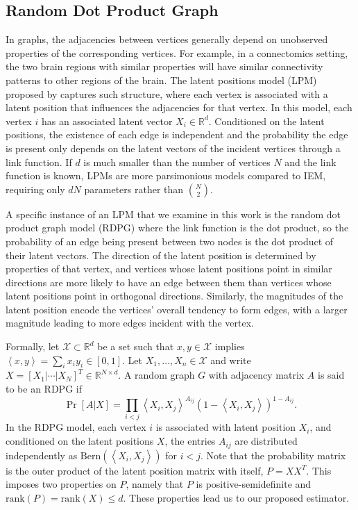 \documentclass[10pt,letterpaper]{article}
\renewcommand{\Re}{\mathbb{R}}
\begin{document}
\subsection{Random Dot Product Graph}
In graphs, the adjacencies between vertices generally depend on unobserved properties of the corresponding vertices. For example, in a connectomics setting, the two brain regions with similar properties will have similar connectivity patterns to other regions of the brain.
The latent positions model (LPM) proposed by \citep{hoff2002latent} captures such structure, where each vertex is associated with a latent position that influences the adjacencies for that vertex.
In this model, each vertex $i$ has an associated latent vector $X_i \in \Re^d$.
Conditioned on the latent positions, the existence of each edge is independent and the probability the edge is present only depends on the latent vectors of the incident vertices through a link function. If $d$ is much smaller than the number of vertices $N$ and the link function is known, LPMs are more parsimonious models compared to IEM, requiring only $dN$ parameters rather than $\binom{N}{2}$.

A specific instance of an LPM that we examine in this work is the random dot product graph model (RDPG) \citep{young2007random, nickel2007random} where the link function is the dot product, so the probability of an edge being present between two nodes is the dot product of their latent vectors.
The direction of the latent position is determined by properties of that vertex, and vertices whose latent positions point in similar directions are more likely to have an edge between them than vertices whose latent positions point in orthogonal directions.
Similarly, the magnitudes of the latent position encode the vertices' overall tendency to form edges, with a larger magnitude leading to more edges incident with the vertex.

Formally, let $\mathcal{X} \subset \Re^d$ be a set such that $x, y \in \mathcal{X}$ implies $\left \langle  x,y \right \rangle =\sum_i x_i y_i \in [0, 1]$.
Let $X_1,\dotsc,X_n\in \mathcal{X}$ and write $X = [X_1|\cdots|X_N]^T \in \Re^{N \times d}$.
A random graph $G$ with adjacency matrix $A$ is said to be an RDPG if
\[
    \Pr[A|X] = \prod_{i<j} \left \langle X_i, X_j \right \rangle^{A_{ij}} \left( 1 - \left \langle X_i, X_j \right \rangle \right)^{1 - A_{ij}}.
\]
In the RDPG model, each vertex $i$ is associated with latent position $X_i$, and conditioned on the latent positions $X$, the entries $A_{ij}$ are distributed independently as $ \text{Bern}(\left \langle X_i, X_j \right \rangle)$ for $i<j$.
Note that the probability matrix is the outer product of the latent position matrix with itself, $P = X X^T$.
This imposes two properties on $P$, namely that $P$ is positive-semidefinite and $\mathrm{rank}(P)=\mathrm{rank}(X)\leq d$.
These properties lead us to our proposed estimator.
\end{document}
